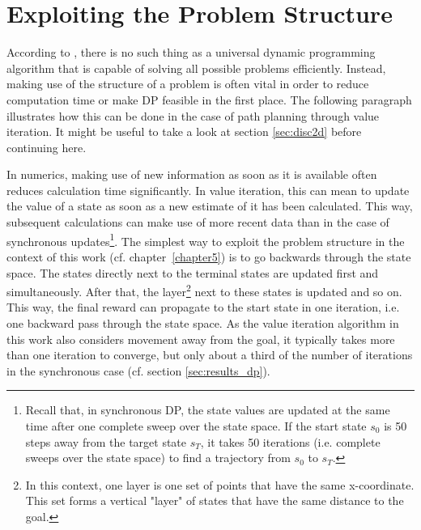 \section{Exploiting the Problem Structure}
\label{sec:prob_structure}
According to \cite{Powell2007ADP}, there is no such thing as a universal dynamic programming algorithm that is capable of solving all possible problems efficiently. Instead, making use of the structure of a problem is often vital in order to reduce computation time or make DP feasible in the first place. The following paragraph illustrates how this can be done in the case of path planning through value iteration. It might be useful to take a look at section \ref{sec:disc2d} before continuing here.

In numerics, making use of new information as soon as it is available often reduces calculation time significantly. In value iteration, this can mean to update the value of a state as soon as a new estimate of it has been calculated. This way, subsequent calculations can make use of more recent data than in the case of synchronous updates\footnote{Recall that, in synchronous DP, the state values are updated at the same time after one complete sweep over the state space. If the start state $s_0$ is 50 steps away from the target state $s_T$, it takes 50 iterations (i.e. complete sweeps over the state space) to find a trajectory from $s_0$ to $s_T$.}. The simplest way to exploit the problem structure in the context of this work (cf. chapter~\ref{chapter5}) is to go backwards through the state space. The states directly next to the terminal states are updated first and simultaneously. After that, the layer\footnote{In this context, one layer is one set of points that have the same x-coordinate. This set forms a vertical "layer" of states that have the same distance to the goal.} next to these states is updated and so on. This way, the final reward can propagate to the start state in one iteration, i.e. one backward pass through the state space. As the value iteration algorithm in this work also considers movement away from the goal, it typically takes more than one iteration to converge, but only about a third of the number of iterations in the synchronous case (cf. section \ref{sec:results_dp}).